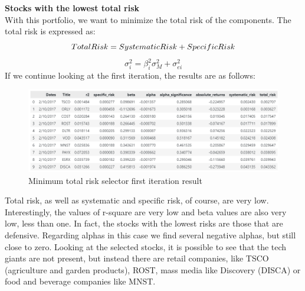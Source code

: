 \documentclass[twocolumn]{article}
\begin{document}
\\\\
\textbf{Stocks with the lowest total risk}\\
With this portfolio, we want to minimize the total risk of the components. The total risk is expressed as:
\begin{equation}
\small{Total Risk = Systematic Risk + Specific Risk}
\end{equation}
\begin{equation}
\sigma_i^2 = \beta_i^2 \sigma_M^2 + \sigma_{ei}^2
\end{equation}
If we continue looking at the first iteration, the results are as follows:
\begin{figure}[t]
\centering\includegraphics[scale=0.5]{minTotalRisk.png}
\caption{Minimum total risk selector first iteration result}
\end{figure}
Total risk, as well as systematic and specific risk, of course, are very low. Interestingly, the values of r-square are very low and beta values are also very low, less than one. In fact, the stocks with the lowest risks are those that are defensive. Regarding alphas in this case we find several negative alphas, but still close to zero. Looking at the selected stocks, it is possible to see that the tech giants are not present, but instead there are retail companies, like TSCO (agriculture and garden products), ROST, mass media like Discovery (DISCA) or food and beverage companies like MNST.  
\end{document}
